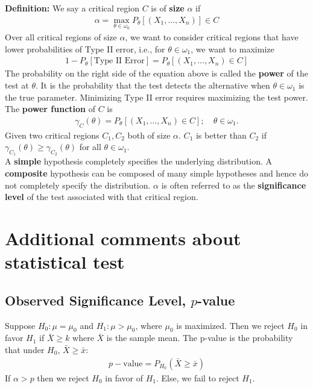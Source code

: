 \documentclass{book}
\theoremstyle{definition}
\begin{document}
\noindent \textbf{Definition:} We say a critical region $C$ is of \textbf{size} $\alpha$ if 
\begin{align}
\boxed{\alpha = \max_{\theta \in \omega_0} P_\theta[(X_1,\dots,X_n)] \in C}
\end{align}
Over all critical regions of size $\alpha$, we want to consider critical regions that have lower probabilities of Type II error, i.e., for $\theta \in \omega_1$, we want to maximize
\begin{align}
{1 - P_\theta[\text{Type II Error}] = P_\theta[(X_1, \dots, X_n) \in C]}
\end{align}
The probability on the right side of the equation above is called the \textbf{power} of the test at $\theta$. It is the probability that the test detects the alternative when $\theta \in \omega_1$ is the true parameter. Minimizing Type II error requires maximizing the test power. The \textbf{power function} of $C$ is 
\begin{align}
\gamma_C(\theta) = P_\theta[(X_1,\dots,X_n) \in C]; \quad \theta \in \omega_1.
\end{align} 
Given two critical regions $C_1,C_2$ both of size $\alpha$. $C_1$ is better than $C_2$ if $\gamma_{C_1}(\theta) \geq \gamma_{C_2}(\theta)$ for all $\theta\in \omega_1$. \\

A \textbf{simple} hypothesis completely specifies the underlying distribution. A \textbf{composite} hypothesis can be composed of many simple hypotheses and hence do not completely specify the distribution. $\alpha$ is often referred to as the \textbf{significance level} of the test associated with that critical region. 




\section{Additional comments about statistical test}



\subsection{Observed Significance Level, $p$-value}
Suppose $H_0: \mu = \mu_0$ and $H_1: \mu > \mu_0$, where $\mu_0$ is maximized. Then we reject $H_0$ in favor $H_1$ if $\bar{X} \geq k$ where $\bar{X}$ is the sample mean. The p-value is the probability that under $H_0$, $\bar{X} \geq \bar{x}$:
\begin{align}
\boxed{p-\text{value} = P_{H_0}(\bar{X} \geq \bar{x})}
\end{align}
If $\alpha > p$ then we reject $H_0$ in favor of $H_1$. Else, we fail to reject $H_1$. 
\end{document}
